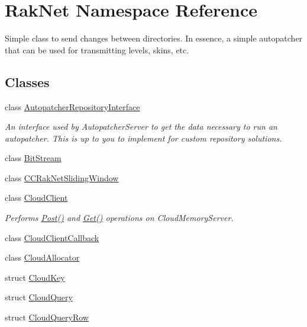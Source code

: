 \hypertarget{namespace_rak_net}{\section{Rak\-Net Namespace Reference}
\label{namespace_rak_net}
}


Simple class to send changes between directories. In essence, a simple autopatcher that can be used for transmitting levels, skins, etc.  


\subsection*{Classes}
\begin{DoxyCompactItemize}
\item 
class \hyperlink{class_rak_net_1_1_autopatcher_repository_interface}{Autopatcher\-Repository\-Interface}
\begin{DoxyCompactList}\small\item\em An interface used by Autopatcher\-Server to get the data necessary to run an autopatcher. This is up to you to implement for custom repository solutions. \end{DoxyCompactList}\item 
class \hyperlink{class_rak_net_1_1_bit_stream}{Bit\-Stream}
\item 
class \hyperlink{class_rak_net_1_1_c_c_rak_net_sliding_window}{C\-C\-Rak\-Net\-Sliding\-Window}
\item 
class \hyperlink{class_rak_net_1_1_cloud_client}{Cloud\-Client}
\begin{DoxyCompactList}\small\item\em Performs \hyperlink{class_rak_net_1_1_cloud_client_aa561b024fd2f02c7f19c1cc36cfd2382}{Post()} and \hyperlink{class_rak_net_1_1_cloud_client_a97bcdfb7e824f979efa7491d3c837204}{Get()} operations on Cloud\-Memory\-Server. \end{DoxyCompactList}\item 
class \hyperlink{class_rak_net_1_1_cloud_client_callback}{Cloud\-Client\-Callback}
\item 
class \hyperlink{class_rak_net_1_1_cloud_allocator}{Cloud\-Allocator}
\item 
struct \hyperlink{struct_rak_net_1_1_cloud_key}{Cloud\-Key}
\item 
struct \hyperlink{struct_rak_net_1_1_cloud_query}{Cloud\-Query}
\item 
struct \hyperlink{struct_rak_net_1_1_cloud_query_row}{Cloud\-Query\-Row}
\item 

\end{DoxyCompactItemize}

